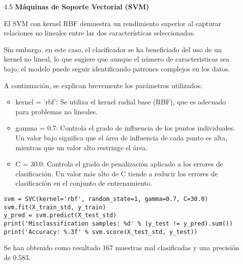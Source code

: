 \documentclass{article}
\begin{document}
\bigskip

\begin{itemize}

\item[4.5]  {\bf M\'aquinas de Soporte Vectorial (SVM)}

El SVM con kernel RBF demuestra un rendimiento superior al capturar relaciones no lineales entre las dos caracter\'isticas seleccionadas.

Sin embargo, en este caso, el clasificador se ha beneficiado del uso de un kernel no lineal, lo que sugiere que aunque el n\'umero de caracteristicas sea bajo, el modelo puede seguir identificando patrones complejos en los datos.

A continuaci\'on, se explican brevemente los par\'ametros utilizados:

\begin{itemize}

\item
kernel = 'rbf': Se utiliza el kernel radial base (RBF), que es adecuado para problemas no lineales.

\item
gamma = 0.7: Controla el grado de influencia de los puntos individuales. Un valor bajo significa que el \'area de influencia de cada punto es alta, mientras que un valor alto restringe el \'area.

\item
C = 30.0: Controla el grado de penalizaci\'on aplicado a los errores de clasificaci\'on. Un valor m\'as alto de C tiende a reducir los errores de clasificaci\'on en el conjunto de entrenamiento.

\end{itemize}

\begin{tcolorbox}[width=14cm]
\begin{scriptsize}
\begin{verbatim}
svm = SVC(kernel='rbf', random_state=1, gamma=0.7, C=30.0)
svm.fit(X_train_std, y_train)
y_pred = svm.predict(X_test_std)
print('Misclassification samples: %d' % (y_test != y_pred).sum())
print('Accuracy: %.3f' % svm.score(X_test_std, y_test))
\end{verbatim}
\end{scriptsize}
\end{tcolorbox}

Se han obtenido como resultado 167 muestras mal clasificadas y una precisi\'on de 0.583.

\end{itemize}
\end{document}

